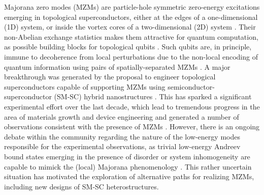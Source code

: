 \documentclass[twocolumn,aps,prb,nofootinbib]{revtex4-2}
\begin{document}
Majorana zero modes (MZMs) are particle-hole symmetric zero-energy excitations emerging  in topological superconductors, either at the edges of a one-dimensional (1D) system, or inside the vortex cores of a two-dimensional (2D) system \cite{Bravyi2002}. Their non-Abelian exchange statistics makes them attractive for quantum computation, as possible building blocks for topological qubits \cite{Nayak2008, Alicea2011}. Such qubits are, in principle, immune to decoherence from local perturbations due to the non-local encoding of quantum information using pairs of spatially-separated MZMs \cite{Kitaev2003}. A major breakthrough was generated by the proposal to engineer topological superconductors capable of supporting MZMs using semiconductor-superconductor (SM-SC) hybrid nanostructures \cite{Lutchyn2010,Oreg2010,Sau2010,Sau2010a}. This  has sparked a significant experimental effort over the last decade, which lead to tremendous progress in the area of materials growth and device engineering and generated a number of observations consistent with the presence of MZMs \cite{Mourik2012,Deng2012,Das2012,Churchill2013,Finck2013,Albrecht2016,Chen2017,Gul2017,Deng2018,Vaitiekenas2018,Chen2019,Grivnin2019,Vaitiekenaseaav2020,Yu2021,Zhang2021}. However, there is an ongoing debate  within the community regarding the nature of the low-energy modes responsible for the experimental observations, as trivial  low-energy Andreev bound states emerging in the presence of disorder or system inhomogeneity are capable to mimick the (local) Majorana phenomenology \cite{Kells2012,Bagrets2012,Liu2012,Prada2012,Roy2013,Adagideli2014,Cayao2015,Liu2017a,Reeg2018a,Moore2018,Moore2018a,Woods2019b,Pan2020,Prada2020,Woods2021,Pan2021a,Sarma2021}. This rather uncertain situation has motivated the exploration of alternative paths for realizing MZMs, including new designs of SM-SC heterostructures. 
\end{document}
